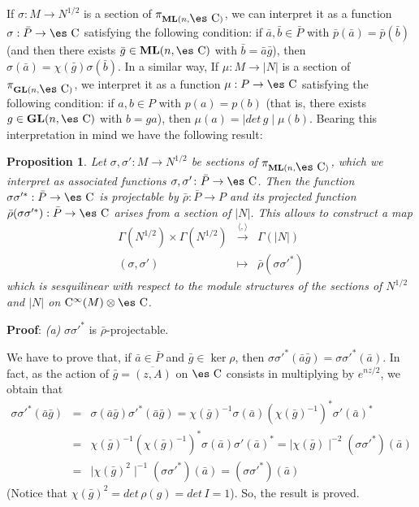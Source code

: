 \documentclass[12pt]{article}
\theoremstyle{plain}
\newtheorem{prop}{Proposition}
\def\beann{\begin{eqnarray*}}
\def\eeann{\end{eqnarray*}}
\def\mapping#1{\mathrel{\mathop{\longrightarrow}\limits^{#1}}}
\def\GL{{\bf GL}(n,\Complex )}
\def\ML{{\bf ML}(n,\Complex )}
\def\Complex{\mbox{\es C}}
\def\Cinfty{{\rm C}^\infty}
\begin{document}
If $\sigma : M \to N^{1/2}$ is a section of $\pi_{\ML}$, we can
interpret it as a function $\sigma : \bar P \to \Complex$
satisfying the following condition: if $\bar a, \bar b \in \bar P$
with $\bar p (\bar a) = \bar p (\bar b)$ (and then there exists
$\bar g \in \ML$ with $\bar b = \bar a \bar g$), then $\sigma
(\bar a) = \chi (\bar g) \sigma (\bar b)$. In a similar way, If
$\mu : M \to | N |$ is a section of $\pi_{\GL}$, we interpret it
as a function $\mu : P \to \Complex$ satisfying the following
condition: if $a,b \in P$ with $p(a) = p(b)$ (that is, there
exists $g \in \GL$ with $b=ga$), then $\mu (a) = \mid det\, g \mid
\mu (b)$. Bearing this interpretation in mind we have the
following result:

\begin{prop}
Let $\sigma ,\sigma '\colon M \to N^{1/2}$ be sections of
$\pi_{\ML}$, which we interpret as associated functions $\sigma
,\sigma ' \colon\bar P \to \Complex$. Then the function $\sigma
\sigma '^* : \bar P \to \Complex$ is projectable by $\bar \rho :
\bar P \to P$ and its projected function $\bar \rho (\sigma \sigma
'^*) : \bar P \to \Complex$ arises from a section of $| N |$. This
allows to construct a map $$
\begin{array}{ccc}
\Gamma (N^{1/2}) \times \Gamma (N^{1/2})
& \mapping{\langle , \rangle} &
\Gamma (| N |)
\\
(\sigma ,\sigma ') & \mapsto & \bar \rho (\sigma \sigma '^*)
\end{array}
$$
which is sesquilinear with respect to the module structures of the
sections of
$N^{1/2}$ and $| N |$ on $\Cinfty(M)\otimes\Complex$.
\label{propi1}
\end{prop}
{\bf Proof}: 
{\it (a)} \quad
$\sigma \sigma '^*$ is $\bar \rho$-projectable.

We have to prove that, if $\bar a \in \bar P$ and $\bar g \in \ker
\rho$, then
$\sigma \sigma '^*(\bar a \bar g) = \sigma \sigma '^*(\bar a)$.
In fact, as the action of $\bar g = \overline{(z,A)}$ on $\Complex$
consists in multiplying by
$e^{nz/2}$, we obtain that
\beann
\sigma \sigma '^*(\bar a \bar g)
& = &
\sigma (\bar a \bar g) \sigma '^*(\bar a \bar g) =
\chi (\bar g)^{-1} \sigma (\bar a)
(\chi (\bar g)^{-1})^* \sigma '(\bar a)^*
\\
& = &
\chi (\bar g)^{-1} (\chi (\bar g)^{-1})^*
\sigma (\bar a) \sigma '(\bar a)^* =
\mid \chi (\bar g) \mid ^{-2} (\sigma \sigma '^*)(\bar a) \\
&=&
\mid \chi (\bar g)^2 \mid ^{-1} (\sigma \sigma '^*)(\bar a)=
(\sigma{\sigma '}^*)(\bar a)
\eeann
(Notice that $\chi (\bar g)^2 = det\, \rho (g) = det\, I = 1$).
So, the result is proved.
\end{document}
